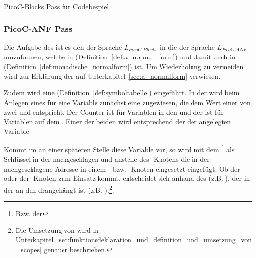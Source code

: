 \begin{code}
  \centering
  \caption{PicoC-Blocks Pass für Codebespiel}
  \label{code:picoc_blocks_pass_für_codebeispiel}
\end{code}

\subsubsection{PicoC-ANF Pass}
\label{picoc_mon_pass}

\label{sec:picoc_mon_pass_zweck}

Die Aufgabe des  ist es den  der Sprache $L_{PicoC\_Blocks}$ in die  der Sprache $L_{PicoC\_ANF}$ umzuformen, welche in  (Definition~\ref{def:a_normal_form}) und damit auch in  (Definition~\ref{def:monadische_normalform}) ist. Um Wiederholung zu vermeiden wird zur Erklärung der  auf Unterkapitel~\ref{sec:a_normalform} verwiesen.

Zudem wird eine  (Definition~\ref{def:symboltabelle}) eingeführt. In der  wird beim Anlegen eines  für eine Variable zunächst eine  zugewiesen, die dem Wert einer von zwei    und   entspricht. Der Counter  ist für Variablen in den  und der    ist für Variablen auf dem . Einer der beiden  wird entsprechend der  der angelegten Variable .

Kommt im  an einer späteren Stelle diese Variable  vor, so wird mit dem \footnote{Bzw. der } als Schlüssel in der  nachgeschlagen und anstelle des -Knotens die in der  nachgeschlagene Adresse in einem - bzw. -Knoten eingesetzt eingefügt. Ob der - oder  der -Knoten zum Einsatz kommt, entscheidet sich anhand des  (z.B. ), der in der  an den  drangehängt ist (z.B. ).\footnote{Die Umsetzung von  wird in Unterkapitel~\ref{sec:funktionsdeklaration_und_definition_und_umsetzung_von_scopes} genauer beschrieben.}.

